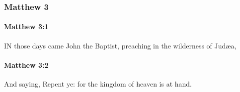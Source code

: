	\subsubsection{Matthew 3} %
		\label{MATTHEW-3}
		
		\paragraph{Matthew 3:1} %
			\label{MATTHEW-3-1}

			IN those days came John the Baptist, preaching in the wilderness of Judæa,

			\begin{framed}
			\scriptsize
				\begin{compactdesc}
					\item[SBLG] 
				\end{compactdesc}
			\end{framed}

		\paragraph{Matthew 3:2} %
			\label{MATTHEW-3-2}

			And saying, Repent ye: for the kingdom of heaven is at hand.


